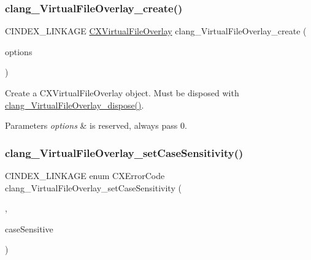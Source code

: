\subsubsection{\texorpdfstring{clang\+\_\+\+Virtual\+File\+Overlay\+\_\+create()}{clang\_VirtualFileOverlay\_create()}}
{\footnotesize\ttfamily C\+I\+N\+D\+E\+X\+\_\+\+L\+I\+N\+K\+A\+GE \mbox{\hyperlink{group__BUILD__SYSTEM_gae854e36ceb0a02071e557e19f908772d}{C\+X\+Virtual\+File\+Overlay}} clang\+\_\+\+Virtual\+File\+Overlay\+\_\+create (\begin{DoxyParamCaption}\item[{unsigned}]{options }\end{DoxyParamCaption})}



Create a {\ttfamily C\+X\+Virtual\+File\+Overlay} object. Must be disposed with {\ttfamily \mbox{\hyperlink{group__BUILD__SYSTEM_ga118f45b2f96f989fc1f39f3f95973deb}{clang\+\_\+\+Virtual\+File\+Overlay\+\_\+dispose()}}}. 


\begin{DoxyParams}{Parameters}
{\em options} & is reserved, always pass 0. \\
\hline
\end{DoxyParams}
\mbox{\label{group__BUILD__SYSTEM_ga00ca3247ef5f5e3ac504ce13623939e3}} 
\subsubsection{\texorpdfstring{clang\+\_\+\+Virtual\+File\+Overlay\+\_\+set\+Case\+Sensitivity()}{clang\_VirtualFileOverlay\_setCaseSensitivity()}}
{\footnotesize\ttfamily C\+I\+N\+D\+E\+X\+\_\+\+L\+I\+N\+K\+A\+GE enum C\+X\+Error\+Code clang\+\_\+\+Virtual\+File\+Overlay\+\_\+set\+Case\+Sensitivity (\begin{DoxyParamCaption}\item[{\mbox{\hyperlink{group__BUILD__SYSTEM_gae854e36ceb0a02071e557e19f908772d}{C\+X\+Virtual\+File\+Overlay}}}]{,  }\item[{int}]{case\+Sensitive }\end{DoxyParamCaption})}



